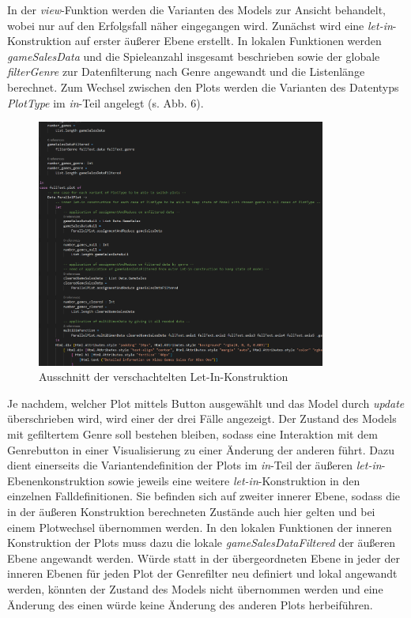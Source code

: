 \documentclass[usegeometry=true]{scrartcl}
\begin{document}
In der \textit{view}-Funktion werden die Varianten des Models zur Ansicht behandelt, wobei nur auf den Erfolgsfall näher eingegangen wird. 
Zunächst wird eine \textit{let-in}-Konstruktion auf erster äußerer Ebene erstellt. 
In lokalen Funktionen werden \textit{gameSalesData} und die Spieleanzahl insgesamt beschrieben 
sowie der globale \textit{filterGenre} zur Datenfilterung nach Genre angewandt und die Listenlänge berechnet. 
Zum Wechsel zwischen den Plots werden die Varianten des Datentyps \textit{PlotType} im \textit{in}-Teil angelegt (s. Abb. 6). 
\begin{figure}[h]
	\centering
        \includegraphics[width=9.5cm]{Bilder/Code_letinconstruction.png}
        \caption{Ausschnitt der verschachtelten Let-In-Konstruktion}
        \label{fig:LetIn}
\end{figure}
Je nachdem, welcher Plot mittels Button ausgewählt und das Model durch \textit{update} überschrieben wird, wird einer der drei Fälle angezeigt. 
Der Zustand des Models mit gefiltertem Genre soll bestehen bleiben, 
sodass eine Interaktion mit dem Genrebutton in einer Visualisierung zu einer Änderung der anderen führt.
Dazu dient einerseits die Variantendefinition der Plots im \textit{in}-Teil der äußeren \textit{let-in}-Ebenenkonstruktion 
sowie jeweils eine weitere \textit{let-in}-Konstruktion in den einzelnen Falldefinitionen.
Sie befinden sich auf zweiter innerer Ebene, sodass die in der äußeren Konstruktion berechneten Zustände auch hier gelten 
und bei einem Plotwechsel übernommen werden. 
In den lokalen Funktionen der inneren Konstruktion der Plots muss dazu die lokale \textit{gameSalesDataFiltered} der äußeren Ebene angewandt werden. 
Würde statt in der übergeordneten Ebene in jeder der inneren Ebenen für jeden Plot der Genrefilter neu definiert und lokal angewandt werden, 
könnten der Zustand des Models nicht übernommen werden und eine Änderung des einen würde keine Änderung des anderen Plots herbeiführen.
\end{document}
